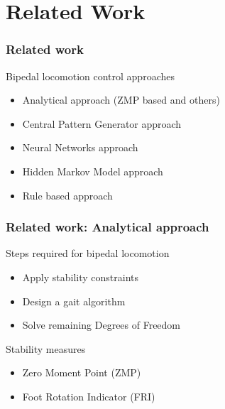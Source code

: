 \documentclass{beamer}
\begin{document}
	\section*{Related Work}
	\begin{frame}
		\frametitle{Related work}
		\begin{block}{Bipedal locomotion control approaches}
			\begin{itemize}
				\item
					Analytical approach (ZMP based and others)
				\item
					Central Pattern Generator approach
				\item
					Neural Networks approach
				\item 
					Hidden Markov Model approach
				\item
					Rule based approach
			\end{itemize}
		\end{block}
	\end{frame}


	\begin{frame}
		\frametitle{Related work: Analytical approach}
		\begin{block}{Steps required for bipedal locomotion}
			\begin{itemize}
				\item
					Apply stability constraints
				\item
					Design a gait algorithm
				\item
					Solve remaining Degrees of Freedom
			\end{itemize}
		\end{block}
		\begin{block}{Stability measures}
			\begin{itemize}
				\item
					Zero Moment Point (ZMP)
				\item
					Foot Rotation Indicator (FRI)
			\end{itemize}
		\end{block}
 	\end{frame}
	
\end{document}
